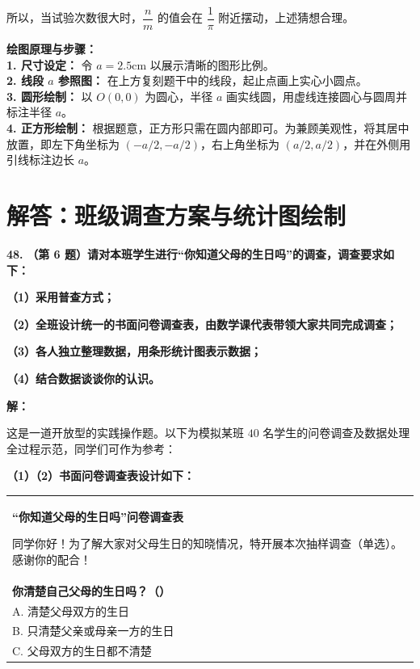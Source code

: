 所以，当试验次数很大时，$\dfrac{n}{m}$ 的值会在 $\dfrac{1}{\pi}$ 附近摆动，上述猜想合理。

\vspace{0.4cm}
{\small\color{blue!70!black}
\textbf{绘图原理与步骤：}\\
\textbf{1. 尺寸设定：} 令 $a = 2.5$cm 以展示清晰的图形比例。\\
\textbf{2. 线段 $a$ 参照图：} 在上方复刻题干中的线段，起止点画上实心小圆点。\\
\textbf{3. 圆形绘制：} 以 $O(0,0)$ 为圆心，半径 $a$ 画实线圆，用虚线连接圆心与圆周并标注半径 $a$。\\
\textbf{4. 正方形绘制：} 根据题意，正方形只需在圆内部即可。为兼顾美观性，将其居中放置，即左下角坐标为 $(-a/2, -a/2)$，右上角坐标为 $(a/2, a/2)$，并在外侧用引线标注边长 $a$。
}

\newpage



\newpage

\section{解答：班级调查方案与统计图绘制}

\vspace{0.6cm}

\textbf{\LARGE 48.} \textbf{（第 6 题）请对本班学生进行“你知道父母的生日吗”的调查，调查要求如下：}

\textbf{（1）采用普查方式；}

\textbf{（2）全班设计统一的书面问卷调查表，由数学课代表带领大家共同完成调查；}

\textbf{（3）各人独立整理数据，用条形统计图表示数据；}

\textbf{（4）结合数据谈谈你的认识。}

\vspace{0.4cm}
\textbf{解：}

这是一道开放型的实践操作题。以下为模拟某班 $40$ 名学生的问卷调查及数据处理全过程示范，同学们可作为参考：

\vspace{0.3cm}
\textbf{（1）（2）书面问卷调查表设计如下：}

\begin{center}
\renewcommand{\arraystretch}{1.5}
\begin{tabular}{|p{}|}
\hline
\begin{center}\textbf{“你知道父母的生日吗”问卷调查表}\end{center}
同学你好！为了解大家对父母生日的知晓情况，特开展本次抽样调查（单选）。感谢你的配合！\\[0.2cm]
\textbf{你清楚自己父母的生日吗？（\quad）}\\[0.1cm]
A. 清楚父母双方的生日\\
B. 只清楚父亲或母亲一方的生日\\
C. 父母双方的生日都不清楚\\[0.1cm]
\hline
\end{tabular}
\end{center}

